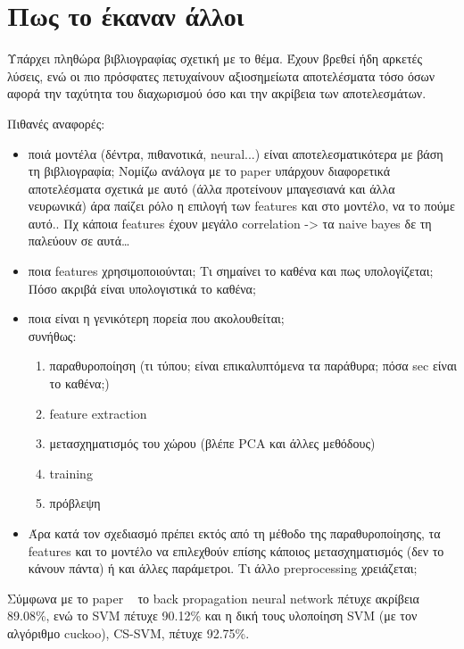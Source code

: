 \section{Πως το έκαναν άλλοι}


Υπάρχει πληθώρα βιβλιογραφίας σχετική με το θέμα. Έχουν βρεθεί ήδη
αρκετές λύσεις, ενώ οι πιο πρόσφατες πετυχαίνουν αξιοσημείωτα
αποτελέσματα τόσο όσων αφορά την ταχύτητα του διαχωρισμού όσο και την
ακρίβεια των αποτελεσμάτων.



Πιθανές αναφορές:
\begin{itemize}[noitemsep]
\item ποιά μοντέλα (δέντρα, πιθανοτικά, neural...) είναι
  αποτελεσματικότερα με βάση τη βιβλιογραφία; Νομίζω ανάλογα με το
  paper υπάρχουν διαφορετικά αποτελέσματα σχετικά με αυτό (άλλα
  προτείνουν μπαγεσιανά και άλλα νευρωνικά) άρα παίζει ρόλο η επιλογή
  των features και στο μοντέλο, να το πούμε αυτό.. Πχ κάποια features
  έχουν μεγάλο correlation -> τα naive bayes δε τη παλεύουν σε αυτά…
  
\item ποια features χρησιμοποιούνται; Τι σημαίνει το καθένα και πως
  υπολογίζεται; Πόσο ακριβά είναι υπολογιστικά το καθένα;
  
\item ποια είναι η γενικότερη πορεία που ακολουθείται;\\
  συνήθως:
  
  \begin{enumerate}[noitemsep]
  \item παραθυροποίηση (τι τύπου; είναι επικαλυπτόμενα τα παράθυρα;
    πόσα sec είναι το καθένα;)
  \item feature extraction
  \item μετασχηματισμός του χώρου (βλέπε PCA και άλλες μεθόδους)
  \item training
  \item πρόβλεψη
  \end{enumerate}
  
\item Άρα κατά τον σχεδιασμό πρέπει εκτός από τη μέθοδο της
  παραθυροποίησης, τα features και το μοντέλο να επιλεχθούν επίσης
  κάποιος μετασχηματισμός (δεν το κάνουν πάντα) ή και άλλες
  παράμετροι. Τι άλλο preprocessing χρειάζεται;
    
\end{itemize}

Σύμφωνα με το paper ~\cite{cuckoo} το back propagation neural network πέτυχε
ακρίβεια 89.08\%, ενώ το SVM πέτυχε 90.12\% και η δική τους υλοποίηση
SVM (με τον αλγόριθμο cuckoo), CS-SVM, πέτυχε 92.75\%.
